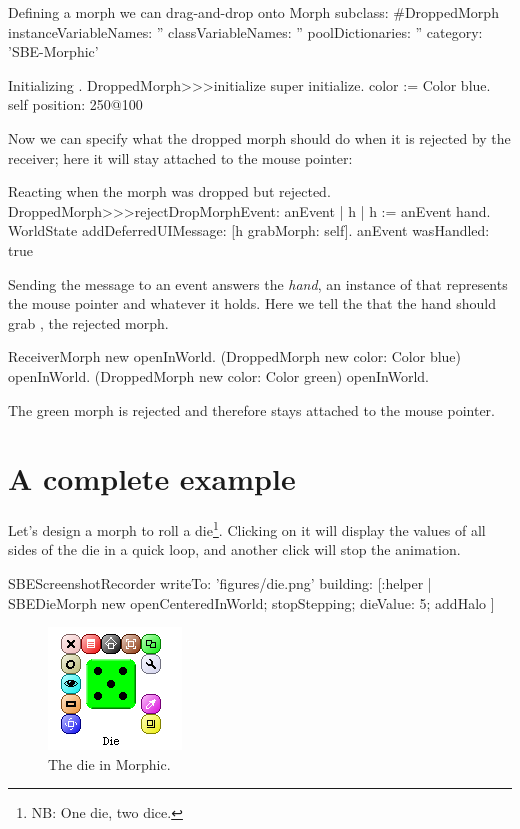 \documentclass[a4paper,10pt,twoside]{book}
\begin{document}
\begin{classdef}{Defining a morph we can drag-and-drop onto }
Morph subclass: #DroppedMorph
	instanceVariableNames: ''
	classVariableNames: ''
	poolDictionaries: ''
	category: 'SBE-Morphic'
\end{classdef}

\begin{method}{Initializing .}
DroppedMorph>>>initialize
	super initialize.
	color := Color blue.
	self position: 250@100
\end{method}

Now we can specify what the dropped morph should do when it is rejected by the receiver; here it will stay attached to the mouse pointer:
\begin{method}{Reacting when the morph was dropped but rejected.}
DroppedMorph>>>rejectDropMorphEvent: anEvent
	| h |
	h := anEvent hand.
	WorldState
		addDeferredUIMessage: [h grabMorph: self].
	anEvent wasHandled: true
\end{method}

Sending the  message to an event answers the \emph{hand}, an instance of  that represents the mouse pointer and whatever it holds.
Here we tell the  that the hand should grab , the rejected morph.

\begin{code}{}
ReceiverMorph new openInWorld.
(DroppedMorph new color: Color blue) openInWorld.
(DroppedMorph new color: Color green) openInWorld.
\end{code}
\noindent
The green morph is rejected and therefore stays attached to the mouse pointer.

\section{A complete example}

Let's design a morph to roll a die\footnote{NB: One die, two dice.}. Clicking on it will display the values of all sides of the die in a quick loop, and another click will stop the animation.

\begin{ExecuteSmalltalkScript}
SBEScreenshotRecorder writeTo: 'figures/die.png' building: [:helper |
	SBEDieMorph new
		openCenteredInWorld;
		stopStepping;
		dieValue: 5;
		addHalo
]
\end{ExecuteSmalltalkScript}
\begin{figure}[ht]
	\centerline{\includegraphics[scale=0.65]{die}}
	\caption{The die in Morphic.
		\label{fig:dialogDie}}
\end{figure}
\end{document}
